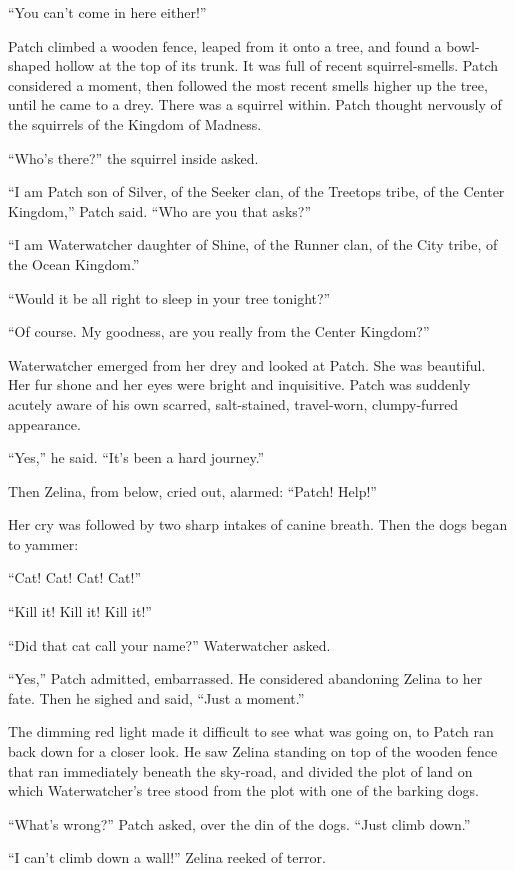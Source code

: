 \documentclass[ebook,oneside,openany,17pt]{memoir}
\begin{document}
“You can’t come in here either!”

Patch climbed a wooden fence, leaped from it onto a tree, and found a
bowl-shaped hollow at the top of its trunk. It was full of recent
squirrel-smells. Patch considered a moment, then followed the most
recent smells higher up the tree, until he came to a drey. There was a
squirrel within. Patch thought nervously of the squirrels of the
Kingdom of Madness.

“Who’s there?” the squirrel inside asked.

“I am Patch son of Silver, of the Seeker clan, of the Treetops tribe,
of the Center Kingdom,” Patch said. “Who are you that asks?”

“I am Waterwatcher daughter of Shine, of the Runner clan, of the City
tribe, of the Ocean Kingdom.”

“Would it be all right to sleep in your tree tonight?”

“Of course. My goodness, are you really from the Center Kingdom?”

Waterwatcher emerged from her drey and looked at Patch. She was
beautiful. Her fur shone and her eyes were bright and
inquisitive. Patch was suddenly acutely aware of his own scarred,
salt-stained, travel-worn, clumpy-furred appearance.

“Yes,” he said. “It’s been a hard journey.”

Then Zelina, from below, cried out, alarmed: “Patch! Help!”

Her cry was followed by two sharp intakes of canine breath. Then the
dogs began to yammer:

“Cat! Cat! Cat! Cat!”

“Kill it! Kill it! Kill it!”

“Did that cat call your name?” Waterwatcher asked.

“Yes,” Patch admitted, embarrassed. He considered abandoning Zelina to
her fate. Then he sighed and said, “Just a moment.”

The dimming red light made it difficult to see what was going on, to
Patch ran back down for a closer look. He saw Zelina standing on top
of the wooden fence that ran immediately beneath the sky-road, and
divided the plot of land on which Waterwatcher’s tree stood from the
plot with one of the barking dogs.

“What’s wrong?” Patch asked, over the din of the dogs. “Just climb
down.”

“I can’t climb down a wall!” Zelina reeked of terror.
\end{document}
